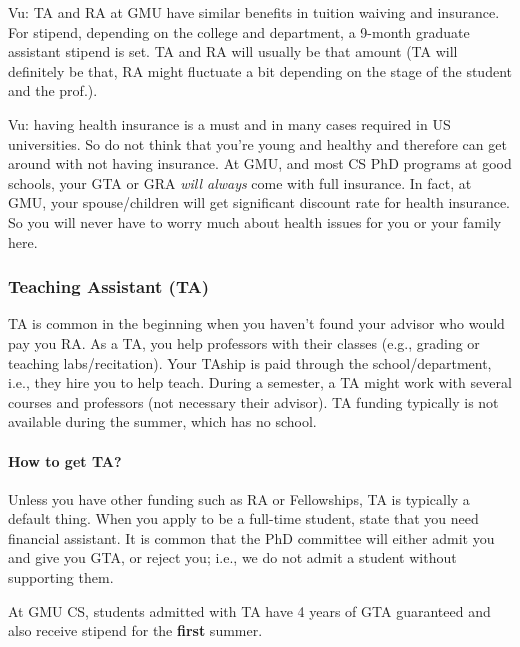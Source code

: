 \documentclass[11pt]{article}
\newenvironment{commentbox}{
 \small
    \begin{cbox}
 }{
   \end{cbox}
}
\begin{document}
\begin{commentbox}
Vu: TA and RA at GMU have similar benefits in tuition waiving and insurance.  For stipend, depending on the college and department, a 9-month graduate assistant stipend is set.  TA and RA will usually be that amount (TA will definitely be that, RA might fluctuate a bit depending on the stage of the student and the prof.). 
\end{commentbox}

\begin{commentbox}
Vu: having health insurance is a must and in many cases required in US universities.  So do not think that you're young and healthy and therefore can get around with not having insurance.  At GMU, and most CS PhD programs at good schools, your GTA or GRA \emph{will always} come with full insurance. In fact, at GMU, your spouse/children will get significant discount rate for health insurance.  So you will never have to worry much about health issues for you or your family here.
\end{commentbox}


\subsubsection{Teaching Assistant (TA)}

TA is common in the beginning when you haven't found your advisor who would pay you RA. As a TA, you help professors with their classes (e.g., grading or teaching labs/recitation). Your TAship is paid through the school/department, i.e., they hire you to help teach.  During a semester, a TA might work with several courses and professors (not necessary their advisor).  TA funding typically is not available during the summer, which has no school.

\paragraph{How to get TA?}  Unless you have other funding such as RA or Fellowships, TA is typically a default thing. When you apply to be a full-time student,  state that you need financial assistant. It is common that the PhD committee will either admit you and give you GTA, or reject you; i.e., we do not admit a student without supporting them.  

\begin{commentbox}
At GMU CS, students admitted with TA have  4 years of GTA guaranteed and also receive  stipend for the \textbf{first} summer.
\end{commentbox}
\end{document}
